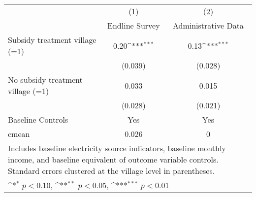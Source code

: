 \def\sym#1{\ifmmode^{#1}\else\(^{#1}\)\fi}
\begin{adjustbox}{max
width={.97\textwidth},caption={Share of households using HPS solar},nofloat=table}
\begin{tabular}{l*{2}{c}}
\toprule
                &\multicolumn{1}{c}{(1)}&\multicolumn{1}{c}{(2)}\\
                &\multicolumn{1}{c}{Endline Survey}&\multicolumn{1}{c}{Administrative Data}\\
\midrule
Subsidy treatment village (=1)&     0.20\sym{***}&     0.13\sym{***}\\
                &  (0.039)         &  (0.028)         \\
No subsidy treatment village (=1)&    0.033         &    0.015         \\
                &  (0.028)         &  (0.021)         \\
Baseline Controls &      Yes         &      Yes         \\
\midrule
cmean           &    0.026         &        0         \\
\bottomrule
\multicolumn{3}{p{\textwidth}}{\footnotesize Includes baseline electricity source indicators, baseline monthly income, and baseline equivalent of outcome variable controls. Standard errors clustered at the village level in parentheses.}\\
\multicolumn{3}{p{\textwidth}}{\footnotesize \sym{*} \(p<0.10\), \sym{**} \(p<0.05\), \sym{***} \(p<0.01\)}\\
\end{tabular}\end{adjustbox}
